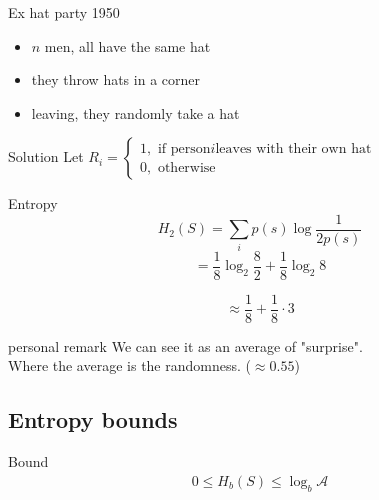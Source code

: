 \begin{parag}{Ex hat party 1950}
    \begin{itemize}
        \item $n$ men, all have the same hat
        \item they throw hats in a corner
        \item leaving, they randomly take a hat
    \end{itemize}
    \begin{subparag}{Solution}
        Let $R_i = \begin{cases}
            1, \text{ if person} i \text{leaves with their own hat} \\
            0, \text{ otherwise}
        \end{cases}$
            
    \end{subparag}

\end{parag}
\begin{parag}{Entropy}
    \begin{equation} H_2(S) =\sum_i p(s)\log \frac{1}{2p(s)} \end{equation}
    \begin{equation} = \frac{1}{8}\log_2 \frac{8}{2} + \frac{1}{8} \log_2 8 \end{equation}
   
    
    \begin{equation} \approx \frac{1}{8} + \frac{1}{8} \cdot 3 \end{equation}
    
  \begin{subparag}{personal remark}
      We can see it as an average of "surprise".
      \\
      Where the average is the randomness. ($\approx 0.55$)
  \end{subparag}  
\end{parag}

\subsection{Entropy bounds}

\begin{parag}{Bound}
    \begin{align*}
        0 \leq H_b(S) \leq \log_b \mathcal{A}
    \end{align*}
    
\end{parag}

